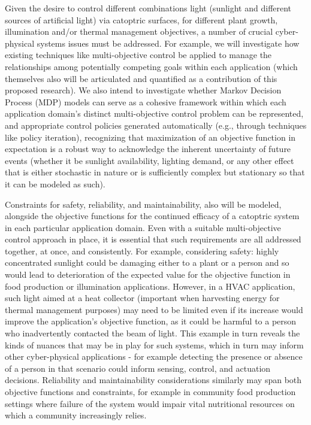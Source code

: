 Given the desire to control different combinations light (sunlight and
different sources of artificial light) via catoptric surfaces, for different
plant growth, illumination and/or thermal management objectives, a number of
crucial cyber-physical systems issues must be addressed.  For example, we will
investigate how existing techniques like multi-objective control be applied to
manage the relationships among potentially competing goals within each
application (which themselves also will be articulated and quantified as a
contribution of this proposed research). We also intend to investigate whether
Markov Decision Process (MDP) models can serve as a cohesive framework within
which each application domain's distinct multi-objective control problem can be
represented, and appropriate control policies generated automatically (e.g.,
through techniques like policy iteration), recognizing that maximization of an
objective function in expectation is a robust way to acknowledge the inherent
uncertainty of future events (whether it be sunlight availability, lighting
demand, or any other effect that is either stochastic in nature or is
sufficiently complex but stationary so that it can be modeled as such).

Constraints for safety, reliability, and maintainability, also will be modeled,
alongside the objective functions for the continued efficacy of a catoptric
system in each particular application domain.  Even with a suitable
multi-objective control approach in place, it is essential that such
requirements are all addressed together, at once, and consistently. For
example, considering safety: highly concentrated sunlight could be damaging
either to a plant or a person and so would lead to deterioration of the
expected value for the objective function in food production or illumination
applications.  However, in a HVAC application, such light aimed at a heat
collector (important when harvesting energy for thermal management purposes)
may need to be limited even if its increase would improve the application's
objective function, as it could be harmful to a person who inadvertently
contacted the beam of light.  This example in turn reveals the kinds of nuances
that may be in play for such systems, which in turn may inform other
cyber-physical applications - for example detecting the presence or absence of
a person in that scenario could inform sensing, control, and actuation
decisions.  Reliability and maintainability considerations similarly may span
both objective functions and constraints, for example in community food
production settings where failure of the system would impair vital nutritional
resources on which a community increasingly relies.

